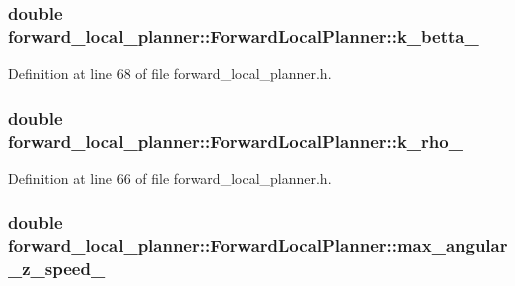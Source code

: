 \subsubsection[{\texorpdfstring{k\+\_\+betta\+\_\+}{k_betta_}}]{\setlength{\rightskip}{0pt plus 5cm}double forward\+\_\+local\+\_\+planner\+::\+Forward\+Local\+Planner\+::k\+\_\+betta\+\_\+\hspace{0.3cm}{\ttfamily [private]}}\hypertarget{classforward__local__planner_1_1ForwardLocalPlanner_ace6b518223f0cabe2fd672d438d83f34}{}\label{classforward__local__planner_1_1ForwardLocalPlanner_ace6b518223f0cabe2fd672d438d83f34}


Definition at line 68 of file forward\+\_\+local\+\_\+planner.\+h.

\subsubsection[{\texorpdfstring{k\+\_\+rho\+\_\+}{k_rho_}}]{\setlength{\rightskip}{0pt plus 5cm}double forward\+\_\+local\+\_\+planner\+::\+Forward\+Local\+Planner\+::k\+\_\+rho\+\_\+\hspace{0.3cm}{\ttfamily [private]}}\hypertarget{classforward__local__planner_1_1ForwardLocalPlanner_a896f36d17c0c1a798e7129bda4c7b0b0}{}\label{classforward__local__planner_1_1ForwardLocalPlanner_a896f36d17c0c1a798e7129bda4c7b0b0}


Definition at line 66 of file forward\+\_\+local\+\_\+planner.\+h.

\subsubsection[{\texorpdfstring{max\+\_\+angular\+\_\+z\+\_\+speed\+\_\+}{max_angular_z_speed_}}]{\setlength{\rightskip}{0pt plus 5cm}double forward\+\_\+local\+\_\+planner\+::\+Forward\+Local\+Planner\+::max\+\_\+angular\+\_\+z\+\_\+speed\+\_\+\hspace{0.3cm}{\ttfamily [private]}}\hypertarget{classforward__local__planner_1_1ForwardLocalPlanner_a20ac6eadd636d34bfb82f416152c1f7a}{}\label{classforward__local__planner_1_1ForwardLocalPlanner_a20ac6eadd636d34bfb82f416152c1f7a}


